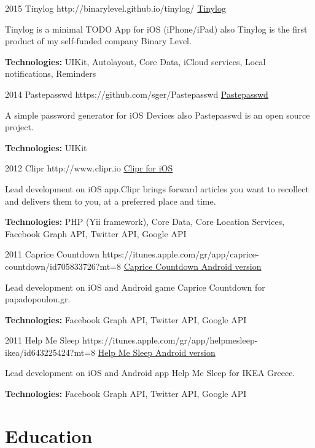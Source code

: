 \documentclass[10pt]{article}
\begin{document}
\job
{2015}{}
{Tinylog}
{http://binarylevel.github.io/tinylog/}
{\href{https://github.com/binarylevel/Tinylog-iOS}{Tinylog}}
{Tinylog is a minimal TODO App for iOS (iPhone/iPad) also Tinylog is the first product of my self-funded company Binary Level.
\\
\rule{0mm}{5mm}\textbf{Technologies:} UIKit, Autolayout, Core Data, iCloud services, Local notifications, Reminders}

\job
{2014}{}
{Pastepasswd}
{https://github.com/sger/Pastepasswd}
{\href{http://www.spirosgerokostas.com/paste-passwd/}{Pastepasswd}}
{A simple password generator for iOS Devices also Pastepasswd is an open source project.
\\
\rule{0mm}{5mm}\textbf{Technologies:} UIKit}

\job
{2012}{}
{Clipr}
{http://www.clipr.io}
{\href{https://itunes.apple.com/us/app/clipr/id582636684?ls=1&mt=8&2}{Clipr for iOS}}
{Lead development on iOS app.Clipr brings forward articles you want to recollect and delivers them to you, at a preferred place and time.
\\
\rule{0mm}{5mm}\textbf{Technologies:} PHP (Yii framework), Core Data, Core Location Services, Facebook Graph API, Twitter API, Google API}

\job
{2011}{}
{Caprice Countdown}
{https://itunes.apple.com/gr/app/caprice-countdown/id705833726?mt=8}
{\href{https://play.google.com/store/apps/details?id=air.CapriceIceAndroid}{Caprice Countdown Android version}}
{Lead development on iOS and Android game Caprice Countdown for papadopoulou.gr.
\\
\rule{0mm}{5mm}\textbf{Technologies:} Facebook Graph API, Twitter API, Google API}

\job
{2011}{}
{Help Me Sleep}
{https://itunes.apple.com/gr/app/helpmesleep-ikea/id643225424?mt=8}
{\href{https://play.google.com/store/apps/details?id=air.HelpMeSleep}{Help Me Sleep Android version}}
{Lead development on iOS and Android app Help Me Sleep for IKEA Greece.
\\
\rule{0mm}{5mm}\textbf{Technologies:} Facebook Graph API, Twitter API, Google API}


\section{Education}
\end{document}
